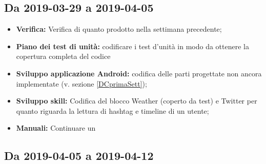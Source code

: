 \begin{flushleft}
\subsection{Da 2019-03-29 a 2019-04-05}
\begin{itemize}
	\item \textbf{Verifica:} Verifica di quanto prodotto nella settimana precedente;
	\item \textbf{Piano dei test di unità:} codificare i test d'unità in modo da ottenere la copertura completa del codice
	\item \textbf{Sviluppo applicazione Android:} codifica delle parti progettate non ancora implementate (v. sezione \ref{DCprimaSett});
	\item \textbf{Sviluppo skill:} Codifica del blocco Weather (coperto da test) e Twitter per quanto riguarda la lettura di hashtag e timeline di un utente;
	\item \textbf{Manuali:} Continuare un  
\end{itemize}

\subsection{Da 2019-04-05 a 2019-04-12}

\newpage

\end{flushleft}
